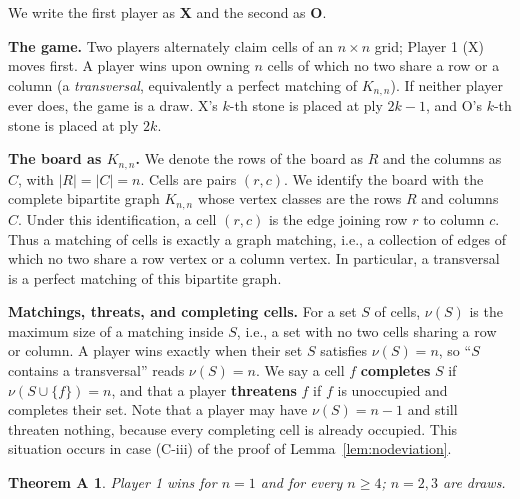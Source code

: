 
\theoremstyle{plain}
\newtheorem*{theoremA}{Theorem A}

We write the first player as \textbf{X} and the second as \textbf{O}.

\medskip

\noindent\textbf{The game.} Two players alternately claim cells of an $n\times n$ grid; Player 1 (X) moves first. A player wins upon owning $n$ cells of which no two share a row or a column (a \emph{transversal}, equivalently a perfect matching of $K_{n,n}$). If neither player ever does, the game is a draw. X's $k$-th stone is placed at ply $2k-1$, and O's $k$-th stone is placed at ply $2k$.

\medskip

\noindent\textbf{The board as $K_{n,n}$.} We denote the rows of the board as $R$ and the columns as $C$, with $|R|=|C|=n$. Cells are pairs $(r,c)$. We identify the board with the complete bipartite graph $K_{n,n}$ whose
vertex classes are the rows $R$ and columns $C$. Under this identification,
a cell $(r,c)$ is the edge joining row $r$ to column
$c$. Thus a matching of cells is
exactly a graph matching, i.e., a collection of edges of which no two share a
row vertex or a column vertex. In particular, a transversal is a perfect
matching of this bipartite graph.

\medskip

\noindent\textbf{Matchings, threats, and completing cells.} For a set $S$ of cells, $\nu(S)$ is the maximum size of a matching inside $S$, i.e., a set with no two cells sharing a row or column. A player wins exactly when their set $S$ satisfies $\nu(S)=n$, so ``$S$ contains a transversal'' reads $\nu(S)=n$. We say a cell $f$ \textbf{completes} $S$ if $\nu(S\cup\{f\})=n$, and that a player \textbf{threatens} $f$ if $f$ is unoccupied and completes their set. Note that a player may have $\nu(S)=n-1$ and still threaten nothing, because every completing cell is already occupied. This situation occurs in case (C-iii) of the proof of Lemma~\ref{lem:nodeviation}.

\begin{theoremA}
Player 1 wins for $n=1$ and for every $n\ge 4$; $n=2,3$ are draws.
\end{theoremA}

